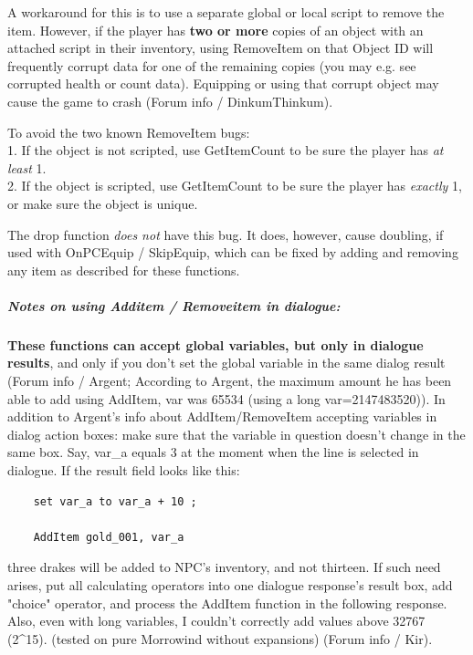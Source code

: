A workaround for this is to use a separate global or local script to
remove the item. However, if the player has \textbf{two or more} copies
of an object with an attached script in their inventory, using
RemoveItem on that Object ID will frequently corrupt data for one of the
remaining copies (you may e.g. see corrupted health or count data).
Equipping or using that corrupt object may cause the game to crash
(Forum info / DinkumThinkum).

To avoid the two known RemoveItem bugs:\\
1. If the object is not scripted, use GetItemCount to be sure the player
has \emph{at least} 1.\\
2. If the object is scripted, use GetItemCount to be sure the player has
\emph{exactly} 1, or make sure the object is unique.

The drop function \emph{does not} have this bug. It does, however, cause
doubling, if used with OnPCEquip / SkipEquip, which can be fixed by
adding and removing any item as described for these functions.

\hypertarget{notes-on-using-additem-removeitem-in-dialogue}{%
\subparagraph{Notes on using Additem / Removeitem in
dialogue:}\label{notes-on-using-additem-removeitem-in-dialogue}}

\textbf{These functions can accept global variables, but only in
dialogue results}, and only if you don't set the global variable in the
same dialog result (Forum info / Argent; According to Argent, the
maximum amount he has been able to add using AddItem, var was 65534
(using a long var=2147483520)). In addition to Argent's info about
AddItem/RemoveItem accepting variables in dialog action boxes: make sure
that the variable in question doesn't change in the same box. Say,
var\_a equals 3 at the moment when the line is selected in dialogue. If
the result field looks like this:

\begin{lstlisting}
	set var_a to var_a + 10 ;
	
	AddItem gold_001, var_a
\end{lstlisting}

three drakes will be added to NPC's inventory, and not thirteen. If such
need arises, put all calculating operators into one dialogue response's
result box, add "choice" operator, and process the AddItem function in
the following response. Also, even with long variables, I couldn't
correctly add values above 32767 (2\^{}15). (tested on pure Morrowind
without expansions) (Forum info / Kir).


